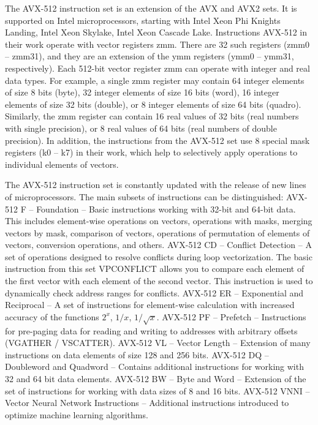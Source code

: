 \documentclass[
11pt,%
tightenlines,%
twoside,%
onecolumn,%
nofloats,%
nobibnotes,%
nofootinbib,%
superscriptaddress,%
noshowpacs,%
centertags]%
{revtex4}
\begin{document}
The AVX-512 instruction set \cite{IntelDev} is an extension of the AVX and AVX2 sets.
It is supported on Intel microprocessors, starting with Intel Xeon Phi Knights Landing, Intel Xeon Skylake, Intel Xeon Cascade Lake.
Instructions AVX-512 in their work operate with vector registers zmm.
There are 32 such registers (zmm0 -- zmm31), and they are an extension of the ymm registers (ymm0 -- ymm31, respectively).
Each 512-bit vector register zmm can operate with integer and real data types.
For example, a single zmm register may contain 64 integer elements of size 8 bits (byte), 32 integer elements of size 16 bits (word), 16 integer elements of size 32 bits (double), or 8 integer elements of size 64 bits (quadro).
Similarly, the zmm register can contain 16 real values of 32 bits (real numbers with single precision), or 8 real values of 64 bits (real numbers of double precision).
In addition, the instructions from the AVX-512 set use 8 special mask registers (k0 -- k7) in their work, which help to selectively apply operations to individual elements of vectors.
    
The AVX-512 instruction set is constantly updated with the release of new lines of microprocessors.
The main subsets of instructions can be distinguished:
AVX-512 F -- Foundation -- Basic instructions working with 32-bit and 64-bit data.
This includes element-wise operations on vectors, operations with masks, merging vectors by mask, comparison of vectors, operations of permutation of elements of vectors, conversion operations, and others.
AVX-512 CD -- Conflict Detection -- A set of operations designed to resolve conflicts during loop vectorization.
The basic instruction from this set VPCONFLICT allows you to compare each element of the first vector with each element of the second vector.
This instruction is used to dynamically check address ranges for conflicts.
AVX-512 ER -- Exponential and Reciprocal -- A set of instructions for element-wise calculation with increased accuracy of the functions $2^x$, $1/x$, $1/\sqrt{x}$.
AVX-512 PF -- Prefetch -- Instructions for pre-paging data for reading and writing to addresses with arbitrary offsets (VGATHER / VSCATTER).
AVX-512 VL -- Vector Length -- Extension of many instructions on data elements of size 128 and 256 bits.
AVX-512 DQ -- Doubleword and Quadword -- Contains additional instructions for working with 32 and 64 bit data elements.
AVX-512 BW -- Byte and Word -- Extension of the set of instructions for working with data sizes of 8 and 16 bits.
AVX-512 VNNI -- Vector Neural Network Instructions -- Additional instructions introduced to optimize machine learning algorithms.
\end{document}
